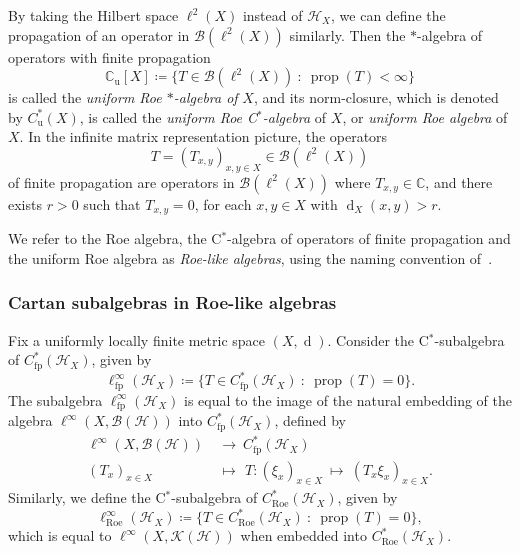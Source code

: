 \documentclass[a4paper]{amsart}
\newcommand{\myhyp}{\textnormal{-}\hskip0pt\relax}
\numberwithin{equation}{section}
\newcommand{\C}{\mathbb{C}}
\newcommand{\Bcal}{\mathcal{B}}
\newcommand{\Hcal}{\mathcal{H}}
\newcommand{\Kcal}{\mathcal{K}}
\newcommand{\cstar}{C$^\ast$\myhyp{}algebra}
\newcommand{\cstarSub}{C$^\ast$\myhyp{}subalgebra}
\newcommand{\bop}[1]{\Bcal({#1})}
\newcommand{\kop}[1]{\Kcal({#1})}
\newcommand{\Croe}[1]{C^{\ast}_{\mathrm{Roe}}(#1)}
\newcommand{\Cu}[1]{C^{\ast}_{\mathrm{u}}({#1})}
\newcommand{\Cfp}[1]{C^{\ast}_{\mathrm{fp}}({#1})}
\newcommand{\Cusub}[1]{\C_{\mathrm{u}}[{#1}]}
\newcommand{\CroeCartan}[1]{\ell^{\infty}_{\mathrm{Roe}}({#1})}
\newcommand{\CfpCartan}[1]{\ell^{\infty}_{\mathrm{fp}}({#1})}
\newcommand{\rAr}{\longrightarrow}
\DeclareMathOperator{\dist}{d}
\newcommand{\prop}[1]{\operatorname{prop} ( {#1} )}
\theoremstyle{plain}
\theoremstyle{indented}
\numberwithin{equation}{section}
\theoremstyle{definition}
\theoremstyle{remark}
\theoremstyle{plain}
\theoremstyle{definition}
\begin{document}
\smallskip

By taking the Hilbert space $\ell^2(X)$ instead of $\Hcal_X$, we can define the propagation of an operator in ${\bop{\ell^2(X)}}$ similarly.
Then the $\ast$\myhyp{}algebra of operators with finite propagation
\begin{equation*}
        \Cusub{X} \coloneq \{ T \in \bop{\ell^2(X)} ~\colon~\prop{T}<\infty \}
\end{equation*}
is called the \emph{uniform Roe $\ast$\myhyp{}algebra of} $X$, and its norm\myhyp{}closure, which is denoted by 
${\Cu{X}}$, is called the \emph{uniform Roe \cstar{}} of $X$, or \emph{uniform Roe algebra} of $X$.
In the infinite matrix representation picture, the operators 
\[T = (T_{x,y})_{x,y \in X}  \in \bop{\ell^2(X)}\] 
of finite propagation are operators in ${\bop{\ell^2(X)}}$ where ${T_{x,y} \in \C}$, 
and there exists $r >0$ such that
${T_{x,y} = 0}$, for each ${x,y \in X}$ with ${\dist_X(x,y) > r}$.
    
\smallskip

We refer to the Roe algebra, the \cstar{} of operators of finite propagation and the uniform Roe algebra
as \emph{Roe\myhyp{}like algebras},
using the naming convention of~\cite{MartinezVigolo2023RoeViaMods}.


\medskip
\subsubsection{Cartan subalgebras in Roe-like algebras}

Fix a uniformly locally finite metric space ${(X, \dist)}$.
Consider the \cstarSub{} of ${\Cfp{\Hcal_X}}$, given by
\begin{equation}
    \CfpCartan{\Hcal_X} \coloneq \{ T \in \Cfp{\Hcal_X}~\colon~\prop{T} = 0 \}.
\end{equation}
The subalgebra ${\CfpCartan{\Hcal_X}}$ is 
equal to the image of the natural embedding of the algebra 
${\ell^\infty (X, \bop{\Hcal})}$ into ${\Cfp{\Hcal_X}}$,
defined by 
\begin{align*}
    \ell^\infty (X, \bop{\Hcal}) &~\rAr~\Cfp{\Hcal_X}\\
    (T_x)_{x \in X} &~\longmapsto~\, T \colon (\xi_x)_{x \in X}~\longmapsto~(T_x \xi_x)_{x \in X} .
\end{align*}
Similarly, we define the \cstarSub{} of $\Croe{\Hcal_X}$, given by
\begin{equation}
    \CroeCartan{\Hcal_X} \coloneq \{ T \in \Croe{\Hcal_X}~\colon~\prop{T} = 0 \},
\end{equation}
which is equal to ${\ell^\infty (X, \kop{\Hcal})}$ when embedded into ${\Croe{\Hcal_X}}$. 
\end{document}
